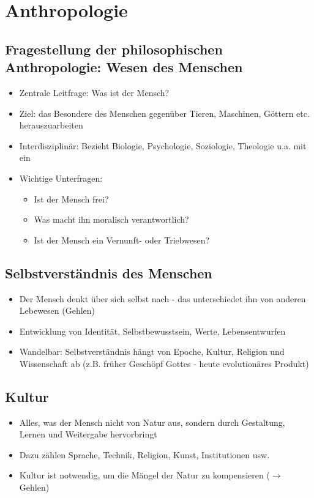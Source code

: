 
\section{Anthropologie}


\subsection{Fragestellung der philosophischen Anthropologie: Wesen des Menschen}
\begin{itemize}
    \item Zentrale Leitfrage: Was ist der Mensch?
    \item Ziel: das Besondere des Menschen gegenüber Tieren, Maschinen, Göttern etc. herauszuarbeiten
    \item Interdisziplinär: Bezieht Biologie, Psychologie, Soziologie, Theologie u.a. mit ein 
    \item Wichtige Unterfragen:
    \begin{itemize}
        \item Ist der Mensch frei?
        \item Was macht ihn moralisch verantwortlich?
        \item Ist der Mensch ein Vernunft- oder Triebwesen?
    \end{itemize}
\end{itemize}

\subsection{Selbstverständnis des Menschen}
\begin{itemize}
    \item Der Mensch denkt über sich selbst nach - das unterschiedet ihn von anderen Lebewesen (Gehlen)
    \item Entwicklung von Identität, Selbstbewusstsein, Werte, Lebensentwurfen
    \item Wandelbar: Selbstverständnis hängt von Epoche, Kultur, Religion und Wissenschaft ab (z.B. früher Geschöpf Gottes - heute evolutionäres Produkt)
\end{itemize}

\subsection{Kultur}
\begin{itemize}
    \item Alles, was der Mensch nicht von Natur aus, sondern durch Gestaltung, Lernen und Weitergabe hervorbringt
    \item Dazu zählen Sprache, Technik, Religion, Kunst, Institutionen usw.
    \item Kultur ist notwendig, um die Mängel der Natur zu kompensieren ($\rightarrow$ Gehlen)
\end{itemize}


